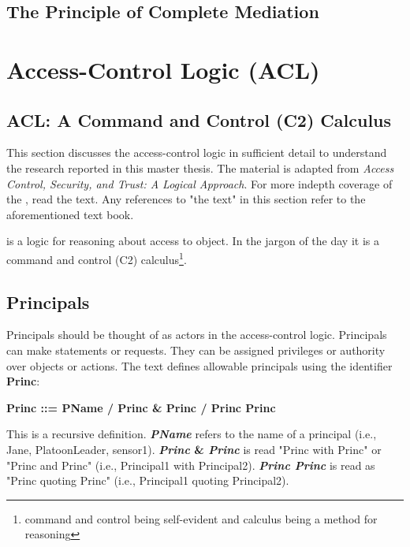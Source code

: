 \documentclass[../../main/main.tex]{subfiles}
\begin{document}
\subsection{The Principle of Complete Mediation}\label{ssec:pcompletemediation}

\section{Access-Control Logic (ACL)} \label{sec:acl}
\subsection{ACL: A Command and Control (C2) Calculus} \label{ssec:aclc2}
This section discusses the access-control logic in sufficient detail to understand the research reported in this master thesis.  The material is adapted from \textit{Access Control, Security, and Trust: A Logical Approach}\cite{ChinOlder}.  For more indepth coverage of the , read the text.  Any references to "the text" in this section refer to the aforementioned text book.

 is a logic for reasoning about access to object.  In the jargon of the day it is a command and control (C2) calculus\footnote{command and control being self-evident and calculus being a method for reasoning}. 

\subsection{Principals}\label{ssec:principals}
Principals should be thought of as actors in the access-control logic.  Principals can make statements or requests.  They can be assigned privileges or authority over objects or actions.  The text defines allowable principals using the identifier \textbf{Princ}:

\begin{center}
\textbf{Princ ::= PName / Princ \& Princ / Princ \textbar  Princ}
\end{center}

This is a recursive definition. \textbf{\textit{PName}} refers to the name of a principal (i.e., Jane, PlatoonLeader, sensor1).  \textbf{\textit{Princ} \& \textit{Princ}} is read "Princ with Princ" or "Princ and Princ" (i.e., Principal1 with Principal2). \textbf{\textit{Princ \textbar  Princ}} is read as "Princ quoting Princ" (i.e., Principal1 quoting Principal2).
\end{document}
